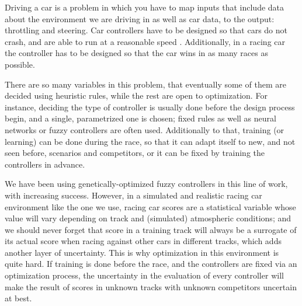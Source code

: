 \documentclass[10pt,journal,compsoc]{IEEEtran}
\begin{document}
\maketitle


\IEEEdisplaynontitleabstractindextext
\IEEEpeerreviewmaketitle




Driving a car is a problem in which you have to map inputs that
include data about the environment we are driving in as well as car
data, to the output: throttling and steering. Car controllers have to
be designed so that cars do not crash, and are able to run at a
reasonable speed \cite{Autodriv2006}. Additionally, in a racing car the controller has to be designed so that the car wins in as many races as possible.

There are so many variables in this problem, that eventually some of
them are decided using heuristic rules, while the rest are open to
optimization. For instance, deciding the type of controller is usually
done before the design process begin, and a single, parametrized one
is chosen; fixed rules as well as neural networks \cite{KIM201287} or fuzzy controllers \cite{PerezEvolvingFuzzy09} are often used. 
Additionally to that, training (or learning) \cite{Loiacono:2012:LEA:2212908.2212953} can be done during the
race, so that it can adapt itself to new, and not seen before,
scenarios and competitors, or it can be fixed by training the
controllers in advance. 

We have been using genetically-optimized fuzzy controllers in this line of work, with increasing success.
However, in a simulated and realistic racing car environment like the one we use, racing car scores are a
    statistical variable whose value will vary depending on track and
    (simulated) atmospheric conditions; and we should never forget
    that score in a training track will always be a surrogate of its
    actual score when racing against other cars in different tracks,
    which adds another layer of uncertainty. This is why optimization
    in this environment is quite hard. If training is done before the
    race, and the controllers are fixed via an optimization process,
    the uncertainty in the evaluation of every controller will make
    the result of scores in unknown tracks with unknown competitors
    uncertain at best.
\end{document}
